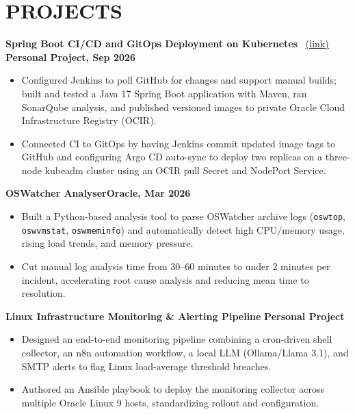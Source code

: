 \documentclass[a4paper,10pt]{extarticle}
\begin{document}
\section*{PROJECTS}
\textbf{Spring Boot CI/CD and GitOps Deployment on Kubernetes}
~\href{https://github.com/shravankumarinchur/Jenkins}{\underline{(link)}}
\hfill\textbf{Personal Project, Sep 2026}\par

\begin{itemize}
  \item Configured Jenkins to poll GitHub for changes and support manual builds;
  built and tested a Java 17 Spring Boot application with Maven, ran SonarQube
  analysis, and published versioned images to private Oracle Cloud Infrastructure
  Registry (OCIR).
  \item Connected CI to GitOps by having Jenkins commit updated image tags to
  GitHub and configuring Argo CD auto-sync to deploy two replicas on a three-node
  kubeadm cluster using an OCIR pull Secret and NodePort Service.
\end{itemize}

\vspace{3pt}
\textbf{OSWatcher Analyser}\hfill\textbf{Oracle, Mar 2026}\par
\begin{itemize}
  \item Built a Python-based analysis tool to parse OSWatcher archive logs
  (\texttt{oswtop}, \texttt{oswvmstat}, \texttt{oswmeminfo}) and automatically detect
  high CPU/memory usage, rising load trends, and memory pressure.
  \item Cut manual log analysis time from 30--60 minutes to under 2 minutes per
  incident, accelerating root cause analysis and reducing mean time to resolution.
\end{itemize}

\vspace{3pt}
\textbf{Linux Infrastructure Monitoring \& Alerting Pipeline}
\hfill\textbf{Personal Project}\par
\begin{itemize}
  \item Designed an end-to-end monitoring pipeline combining a cron-driven shell
  collector, an n8n automation workflow, a local LLM (Ollama/Llama 3.1), and
  SMTP alerts to flag Linux load-average threshold breaches.
  \item Authored an Ansible playbook to deploy the monitoring collector across
  multiple Oracle Linux 9 hosts, standardizing rollout and configuration.
\end{itemize}
\end{document}

